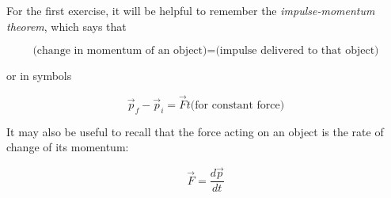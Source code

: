 \documentclass[12pt]{article}
\begin{document}
\Large
\centerline{}

\normalsize
\centerline{}


\bigskip\bigskip

For the first exercise, it will be helpful to remember the {\it impulse-momentum theorem}, which says that 

$$\text{(change in momentum of an object)} = \text{(impulse delivered to that object)}$$

or in symbols

$$\vec p_f - \vec p_i = \vec F t \text{(for constant force)}$$

It may also be useful to recall that the force acting on an object is the rate of change of its momentum:

$$\vec F = \frac{d\vec p}{dt}$$


\newpage
\end{document}
